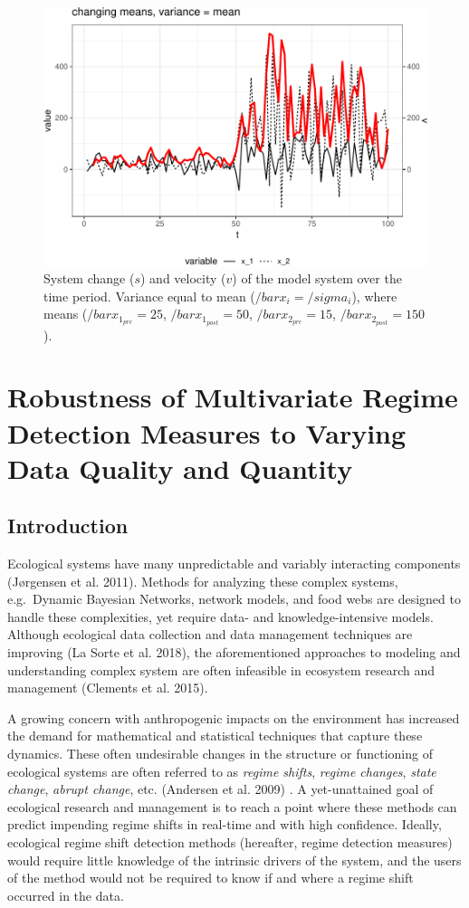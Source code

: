 \documentclass[12pt,twoside,openany]{reedthesis}
\begin{document}
\begin{figure}
\centering
\includegraphics{_myDissertation_files/figure-latex/velocSysEx4-1.pdf}
\caption{\label{fig:velocSysEx4}System change (\(s\)) and velocity (\(v\))
of the model system over the time period. Variance equal to mean
(\(/bar{x_i}=/sigma_i\)), where means (\(/bar{x}_{1_{pre}}=25\),
\(/bar{x}_{1_{post}}=50\), \(/bar{x}_{2_{pre}}=15\),
\(/bar{x}_{2_{post}}=150\)).}
\end{figure}
\chapter{Robustness of Multivariate Regime Detection Measures to Varying
Data Quality and Quantity}\label{resampling}

\section{Introduction}\label{introduction-4}

Ecological systems have many unpredictable and variably interacting
components (Jørgensen et al. 2011). Methods for analyzing these complex
systems, e.g.~Dynamic Bayesian Networks, network models, and food webs
are designed to handle these complexities, yet require data- and
knowledge-intensive models. Although ecological data collection and data
management techniques are improving (La Sorte et al. 2018), the
aforementioned approaches to modeling and understanding complex system
are often infeasible in ecosystem research and management (Clements et
al. 2015).

A growing concern with anthropogenic impacts on the environment has
increased the demand for mathematical and statistical techniques that
capture these dynamics. These often undesirable changes in the structure
or functioning of ecological systems are often referred to as
\emph{regime shifts}, \emph{regime changes}, \emph{state change},
\emph{abrupt change}, etc. (Andersen et al. 2009) . A yet-unattained
goal of ecological research and management is to reach a point where
these methods can predict impending regime shifts in real-time and with
high confidence. Ideally, ecological regime shift detection methods
(hereafter, regime detection measures) would require little knowledge of
the intrinsic drivers of the system, and the users of the method would
not be required to know if and where a regime shift occurred in the
data.
\end{document}
